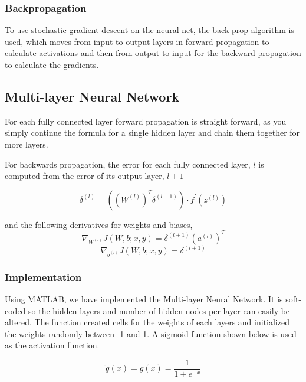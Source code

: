 \documentclass[12pt, twocolumn]{article}
\begin{document}
\subsubsection{Backpropagation}

To use stochastic gradient descent  on the neural net, the back prop algorithm is used, which moves from input to output layers in forward propagation to calculate activations and then from output to input for the backward propagation to calculate the gradients. 


\subsection{Multi-layer Neural Network}


For each fully connected layer forward propagation is straight forward, as you simply continue the formula for a single hidden layer and chain them together for more layers. 

For backwards propagation, the error for each fully connected layer, $l$ is computed from the error of its output layer, $l+1$  

\begin{equation}
\delta^{(l)}=((W^{(l)})^T \delta^{(l+1)}) \cdot f ^{\prime} (z^{(l)})
\end{equation}

and the following derivatives for weights and biases, 
\begin{equation}
\nabla_{W^{(l)}}J(W,b;x,y) = \delta^{(l+1)}(a^{(l)})^T
\end{equation}
\begin{equation}
\nabla_{b^{(l)}}J(W,b;x,y)= \delta^{(l+1)}
\end{equation}

\subsubsection{Implementation}
Using MATLAB, we have implemented the Multi-layer Neural Network. It is soft-coded so the hidden layers and number of hidden nodes per layer can easily be altered. The function created cells for the weights of each layers and initialized the weights randomly between -1 and 1.
\newline
A sigmoid function shown below is used as the activation function.

\begin{equation}
\tilde{g}(x)= g(x) = \frac{1}{ 1+e^{-x}}
\end{equation}
\end{document}
